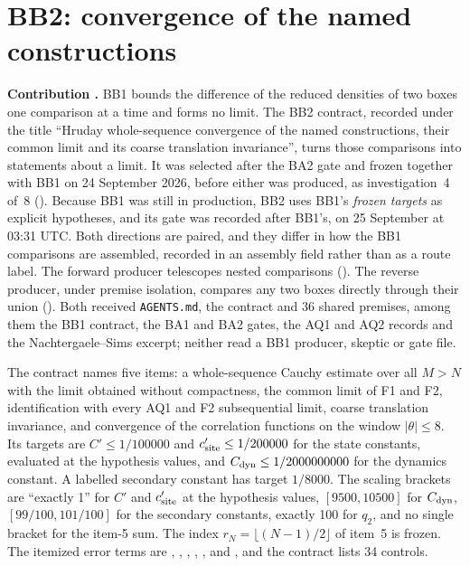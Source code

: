 \section{BB2: convergence of the named constructions}
\label{sec:bb2}

\textbf{Contribution .} BB1 bounds the difference of the
reduced densities of two boxes one comparison at a time and forms no limit.
The BB2 contract, recorded under the title ``Hruday whole-sequence
convergence of the named constructions, their common limit and its coarse
translation invariance'', turns those comparisons into statements about a
limit. It was selected after the BA2 gate and frozen together with BB1 on 24
September 2026, before either was produced, as investigation~4 of~8
(). Because
BB1 was still in production, BB2 uses BB1's \emph{frozen targets} as explicit
hypotheses, and its gate was recorded after BB1's, on 25 September at 03:31
UTC. Both directions are paired, and they differ in how the BB1 comparisons
are assembled, recorded in an assembly field rather than as a route label.
The forward producer telescopes nested comparisons
(). The reverse producer, under premise isolation,
compares any two boxes directly through their union
(). Both received \texttt{AGENTS.md}, the contract and
36 shared premises, among them the BB1 contract, the BA1 and BA2 gates, the
AQ1 and AQ2 records and the Nachtergaele--Sims excerpt; neither read a BB1
producer, skeptic or gate file.

The contract names five items: a whole-sequence Cauchy estimate over all
$M>N$ with the limit obtained without compactness, the common limit of F1 and
F2, identification with every AQ1 and F2 subsequential limit, coarse
translation invariance, and convergence of the correlation functions on the
window $|\theta|\le8$. Its targets are $C'\le1/100000$ and
$c'_{\rm site}\le1/200000$ for the state constants, evaluated at the
hypothesis values, and $C_{\rm dyn}\le1/2000000000$ for the dynamics constant.
A labelled secondary constant has target $1/8000$. The scaling brackets are
``exactly 1'' for $C'$ and $c'_{\rm site}$ at the hypothesis values,
$[9500,10500]$ for $C_{\rm dyn}$, $[99/100,101/100]$ for the secondary
constants, exactly 100 for $q_2$, and no single bracket for the item-5 sum.
The index $r_N=\lfloor(N-1)/2\rfloor$ of item~5 is frozen. The itemized error
terms are ,
,
,
, ,
 and , and the contract lists
34 controls.

